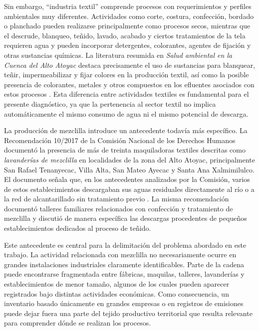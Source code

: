 \documentclass[11pt,letterpaper]{article}
\begin{document}
Sin embargo, ``industria textil'' comprende procesos con requerimientos y perfiles ambientales muy diferentes. Actividades como corte, costura, confección, bordado o planchado pueden realizarse principalmente como procesos secos, mientras que el descrude, blanqueo, teñido, lavado, acabado y ciertos tratamientos de la tela requieren agua y pueden incorporar detergentes, colorantes, agentes de fijación y otras sustancias químicas. La literatura resumida en \textit{Salud ambiental en la Cuenca del Alto Atoyac} destaca precisamente el uso de sustancias para blanquear, teñir, impermeabilizar y fijar colores en la producción textil, así como la posible presencia de colorantes, metales y otros compuestos en los efluentes asociados con estos procesos \cite{perezcastresana2023}. Esta diferencia entre actividades textiles es fundamental para el presente diagnóstico, ya que la pertenencia al sector textil no implica automáticamente el mismo consumo de agua ni el mismo potencial de descarga.

La producción de mezclilla introduce un antecedente todavía más específico. La Recomendación 10/2017 de la Comisión Nacional de los Derechos Humanos documentó la presencia de más de treinta maquiladoras textiles descritas como \textit{lavanderías de mezclilla} en localidades de la zona del Alto Atoyac, principalmente San Rafael Tenanyecac, Villa Alta, San Mateo Ayecac y Santa Ana Xalmimilulco. El documento señala que, en los antecedentes analizados por la Comisión, varios de estos establecimientos descargaban sus aguas residuales directamente al río o a la red de alcantarillado sin tratamiento previo \cite{cndh2017atoyac}. La misma recomendación documentó talleres familiares relacionados con confección y tratamiento de mezclilla y discutió de manera específica las descargas procedentes de pequeños establecimientos dedicados al proceso de teñido.

Este antecedente es central para la delimitación del problema abordado en este trabajo. La actividad relacionada con mezclilla no necesariamente ocurre en grandes instalaciones industriales claramente identificables. Parte de la cadena puede encontrarse fragmentada entre fábricas, maquilas, talleres, lavanderías y establecimientos de menor tamaño, algunos de los cuales pueden aparecer registrados bajo distintas actividades económicas. Como consecuencia, un inventario basado únicamente en grandes empresas o en registros de emisiones puede dejar fuera una parte del tejido productivo territorial que resulta relevante para comprender dónde se realizan los procesos.
\end{document}
